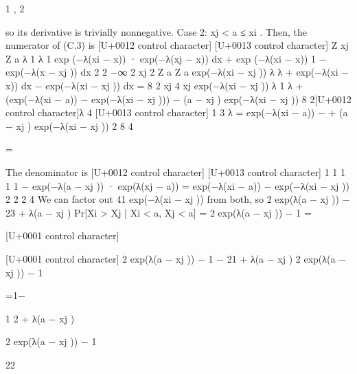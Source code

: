 \documentclass[10pt]{article}
\begin{document}
\begin{ReviewVerbatim}
1
,
2

so its derivative is trivially nonnegative.
Case 2: xj < a ≤ xi .
Then, the numerator of (C.3) is
[U+0012 control character]
[U+0013 control character]
Z xj
Z a
λ
1
λ
1
exp (−λ(xi − x)) · exp(−λ(xj − x)) dx +
exp (−λ(xi − x)) 1 − exp(−λ(x − xj )) dx
2
2
−∞ 2
xj 2
Z a
Z a
exp(−λ(xi − xj )) λ
λ
+
exp(−λ(xi − x)) dx −
exp(−λ(xi − xj )) dx
=
8
2 xj
4 xj
exp(−λ(xi − xj )) λ 1
λ
+
(exp(−λ(xi − a)) − exp(−λ(xi − xj ))) − (a − xj ) exp(−λ(xi − xj ))
8
2[U+0012 control character]λ
4
[U+0013 control character]
1
3 λ
= exp(−λ(xi − a)) −
+ (a − xj ) exp(−λ(xi − xj ))
2
8
4

=

The denominator is
[U+0012 control character]
[U+0013 control character]
1
1
1
1
1 − exp(−λ(a − xj )) · exp(λ(xj − a)) = exp(−λ(xi − a)) − exp(−λ(xi − xj ))
2
2
2
4
We can factor out 41 exp(−λ(xi − xj )) from both, so
2 exp(λ(a − xj )) − 23 + λ(a − xj )
Pr[Xi > Xj | Xi < a, Xj < a] =
2 exp(λ(a − xj )) − 1
=

[U+0001 control character]

[U+0001 control character]
2 exp(λ(a − xj )) − 1 − 21 + λ(a − xj )
2 exp(λ(a − xj )) − 1

=1−

1
2 + λ(a − xj )

2 exp(λ(a − xj )) − 1

22



\end{ReviewVerbatim}
\end{document}
